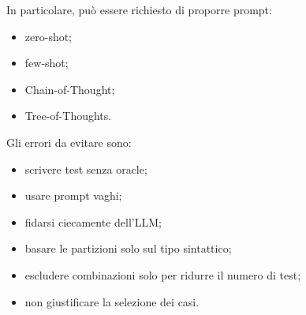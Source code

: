 In particolare, può essere richiesto di proporre prompt:

\begin{itemize}
    \item zero-shot;
    \item few-shot;
    \item Chain-of-Thought;
    \item Tree-of-Thoughts.
\end{itemize}

Gli errori da evitare sono:

\begin{itemize}
    \item scrivere test senza oracle;
    \item usare prompt vaghi;
    \item fidarsi ciecamente dell'LLM;
    \item basare le partizioni solo sul tipo sintattico;
    \item escludere combinazioni solo per ridurre il numero di test;
    \item non giustificare la selezione dei casi.
\end{itemize}

